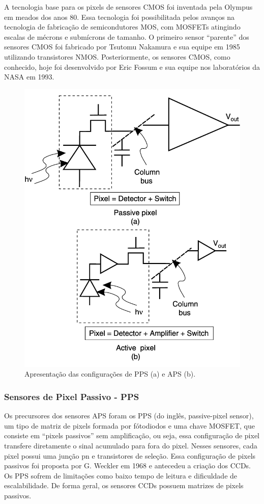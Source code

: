 \documentclass[10pt,a4paper,twocolumn]{article}
\begin{document}
		A tecnologia base para os pixels de sensores CMOS foi inventada pela Olympus em meados dos anos 80. Essa tecnologia foi possibilitada pelos avanços na tecnologia de fabricação de semicondutores MOS, com MOSFETs atingindo escalas de mécrons e submícrons de tamanho. O primeiro sensor ``parente'' dos sensores CMOS foi fabricado por Tsutomu Nakamura e sua equipe em 1985 utilizando transistores NMOS. Posteriormente, os sensores CMOS, como conhecido, hoje foi desenvolvido por Eric Fossum e sua equipe nos laboratórios da NASA em 1993.
		
		\begin{figure}[H]
		\centering
		\includegraphics[scale=0.22]{imagens/passive_vs_active.png}
		\caption{Apresentação das configurações de PPS (a) e APS (b).}
		\end{figure}
		
	\subsubsection*{Sensores de Pixel Passivo - PPS} 
		Os precursores dos sensores APS foram os PPS (do inglês, passive-pixel sensor), um tipo de matriz de pixels formada por fótodiodos e uma chave MOSFET, que consiste em ``pixels passivos'' sem amplificação, ou seja, essa configuração de pixel transfere diretamente o sinal acumulado para fora do pixel. Nesses sensores, cada pixel possui uma junção pn e transistores de seleção. Essa configuração de pixels passivos foi proposta por G. Weckler em 1968 e antecedeu a criação dos CCDs. Os PPS sofrem de limitações como baixo tempo de leitura e dificuldade de escalabilidade. De forma geral, os sensores CCDs possuem matrizes de pixels passivos.
		
\end{document}
